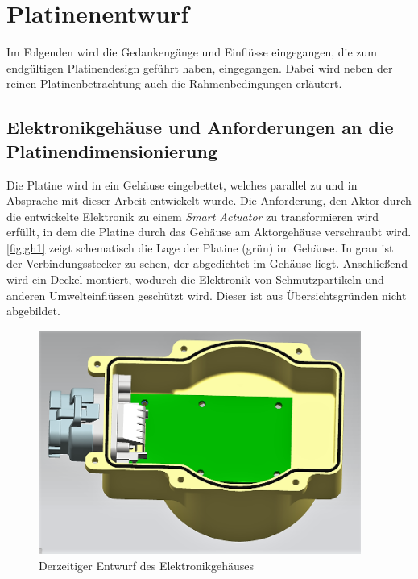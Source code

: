 \chapter{Platinenentwurf}\label{kap5}
Im Folgenden wird die Gedankengänge und Einflüsse eingegangen, die zum endgültigen Platinendesign geführt haben, eingegangen. Dabei wird neben der reinen Platinenbetrachtung auch die Rahmenbedingungen erläutert.
\section{Elektronikgehäuse und Anforderungen an die Platinendimensionierung}
Die Platine wird in ein Gehäuse eingebettet, welches parallel zu und in Absprache mit dieser Arbeit entwickelt wurde. Die Anforderung, den Aktor durch die entwickelte Elektronik zu einem \textit{Smart Actuator} zu transformieren wird erfüllt, in
dem die Platine durch das Gehäuse am Aktorgehäuse verschraubt wird. \autoref{fig:gh1} zeigt schematisch die Lage der Platine (grün) im Gehäuse. In grau ist der Verbindungsstecker zu sehen, der abgedichtet im Gehäuse liegt. Anschließend wird ein Deckel montiert, wodurch die Elektronik von Schmutzpartikeln und anderen Umwelteinflüssen geschützt wird. Dieser ist aus Übersichtsgründen nicht abgebildet.

\begin{figure}[H]%
\centering
\includegraphics[width=300pt]{./Bilder/Elektronik_Gehauese_ver3}%
\caption{Derzeitiger Entwurf des Elektronikgehäuses}%
\label{fig:gh1}%
\end{figure}


